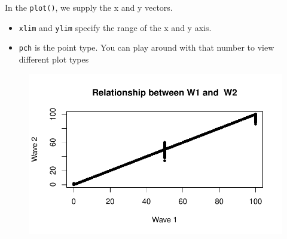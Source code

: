 \documentclass[
  letterpaper,
  DIV=11,
  numbers=noendperiod]{scrreprt}
\newenvironment{Shaded}{\begin{snugshade}}{\end{snugshade}}
\newcommand{\AttributeTok}[1]{\textcolor[rgb]{0.40,0.45,0.13}{#1}}
\newcommand{\DecValTok}[1]{\textcolor[rgb]{0.68,0.00,0.00}{#1}}
\newcommand{\FunctionTok}[1]{\textcolor[rgb]{0.28,0.35,0.67}{#1}}
\newcommand{\NormalTok}[1]{\textcolor[rgb]{0.00,0.23,0.31}{#1}}
\newcommand{\SpecialCharTok}[1]{\textcolor[rgb]{0.37,0.37,0.37}{#1}}
\newcommand{\StringTok}[1]{\textcolor[rgb]{0.13,0.47,0.30}{#1}}
\providecommand{\tightlist}{%
  \setlength{\itemsep}{0pt}\setlength{\parskip}{0pt}}\usepackage{longtable,booktabs,array}
\begin{document}
In the \texttt{plot()}, we supply the x and y vectors.

\begin{itemize}
\tightlist
\item
  \texttt{xlim} and \texttt{ylim} specify the range of the x and y axis.
\item
  \texttt{pch} is the point type. You can play around with that number
  to view different plot types
\end{itemize}

\begin{Shaded}
\end{Shaded}

\begin{figure}[H]

{\centering \includegraphics{04-Visualization_files/figure-pdf/unnamed-chunk-24-1.pdf}

}

\end{figure}
\end{document}
